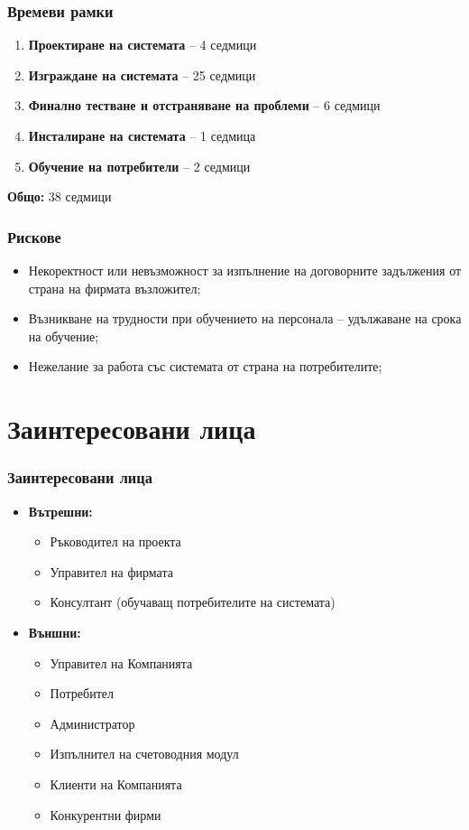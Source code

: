 \documentclass{beamer}
\begin{document}
\begin{frame}
  \frametitle{Времеви рамки}
  \begin{enumerate}
    \item \textbf{Проектиране на системата} – 4 седмици \\
    \item \textbf{Изграждане на системата} – 25 седмици \\
    \item \textbf{Финално тестване и отстраняване на проблеми} – 6 седмици \\
    \item \textbf{Инсталиране на системата} – 1 седмица \\
    \item \textbf{Обучение на потребители} – 2 седмици
  \end{enumerate}
    \textbf{Общо:} 38 седмици 

\end{frame}

\begin{frame}
  \frametitle{Рискове}
  \begin{itemize}
      \item Некоректност или невъзможност за изпълнение на договорните задължения от страна на фирмата възложител;
      \item Възникване на трудности при обучението на персонала – удължаване на срока на обучение;
      \item Нежелание за работа със системата от страна на потребителите;
  \end{itemize}
\end{frame}

\section{Заинтересовани лица}
\begin{frame}
  \frametitle{Заинтересовани лица}
\begin{itemize}
 \item \textbf{Вътрешни:}
     \begin{itemize}
         \item Ръководител на проекта
         \item Управител на фирмата
         \item Консултант (обучаващ потребителите на системата)
     \end{itemize}
  \item \textbf{Външни:}
      \begin{itemize}
          \item Управител на Компанията
          \item Потребител
          \item Администратор
          \item Изпълнител на счетоводния модул
          \item Клиенти на Компанията
          \item Конкурентни фирми
      \end{itemize}
\end{itemize}
\end{frame}
\end{document}
